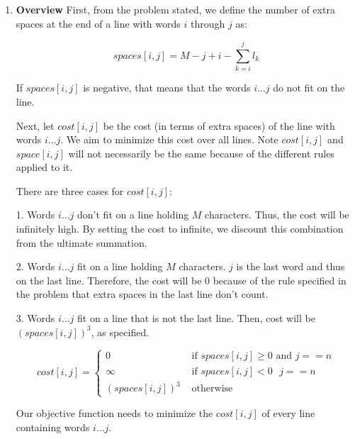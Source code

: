 \documentclass[a4paper]{report}
\begin{document}
\begin{enumerate}
    \par
    \bigskip
    \pagebreak
    \setcounter{equation}{0}
    
    \item 
      {\bf Overview}
      First, from the problem stated, 
      we define the number of extra spaces at the end of a line with words $i$ through $j$ as:

        $$ spaces[i,j] = M - j + i - \sum_{k=i}^{j} l_{k}$$

      If $spaces[i,j]$ is negative, that means that the words $i \dots j$ do not fit on the line. 
      
      Next, let $cost[i,j]$ be the cost (in terms of extra spaces) of the line with words $i \dots j$. We aim to minimize
      this cost over all lines. Note $cost[i,j]$ and $space[i,j]$ will not necessarily be the same because of the different rules
      applied to it.

      There are three cases for $cost[i,j]$:

      1. Words $i \dots j$ don't fit on a line holding $M$ characters. Thus, the cost will be infinitely high.
      By setting the cost to infinite, we discount this combination from the ultimate summation.

      2. Words $i \dots j$ fit on a line holding $M$ characters. $j$ is the last word and thus on the last line.
      Therefore, the cost will be 0 because of the rule specified in the problem that extra spaces in the last line don't count.

      3. Words $i \dots j$ fit on a line that is not the last line. Then, cost will be $(spaces[i,j])^3$, as specified. 

      \begin{displaymath}
        cost[i,j] = \left\{
          \begin{array}{lr}
            0  &   \text{ if $spaces[i,j] \geq 0$ and $j == n$}\\
            \infty  &   \text{ if $spaces[i,j] < 0$ $j == n$}\\
            \text{$(spaces[i,j])^3$} &  \text{ otherwise }
          \end{array}
          \right.
        \end{displaymath} 

      Our objective function needs to minimize the $cost[i,j]$ of every line containing words $i \dots j$. 


\end{enumerate}
\end{document}
